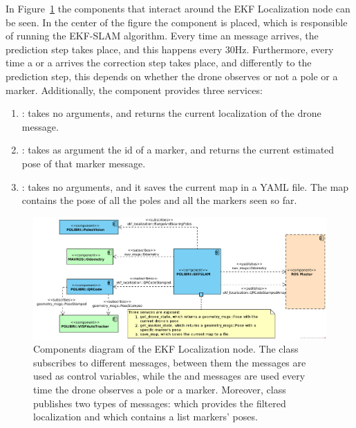 In Figure~\ref{fig:chapter2:architecture:components} the components that interact around the EKF Localization node can be seen. In the center of the figure the  component is placed, which is responsible of running the EKF-SLAM algorithm. Every time an  message arrives, the prediction step takes place, and this happens every 30Hz. Furthermore, every time a  or a  arrives the correction step takes place, and differently to the prediction step, this depends on whether the drone observes or not a pole or a marker. Additionally, the  component provides three services:
\begin{enumerate}
    \item {}: takes no arguments, and returns the current localization of the drone  message.
    \item {}: takes as argument the id of a marker, and returns the current estimated pose of that marker message.
    \item {}: takes no arguments, and it saves the current map in a YAML file. The map contains the pose of all the poles and all the markers seen so far.
\end{enumerate}

\begin{figure}
    \centering
    \includegraphics[width=\textwidth]{Images/fig9-components_diagram}
    \caption[Components diagram of the EKF Localization node]{Components diagram of the EKF Localization node. The  class subscribes to different messages, between them the  messages are used as control variables, while the  and  messages are used every time the drone observes a pole or a marker. Moreover,  class publishes two types of messages:  which provides the filtered localization and  which contains a list markers' poses.}
    \label{fig:chapter2:architecture:components}
\end{figure}

